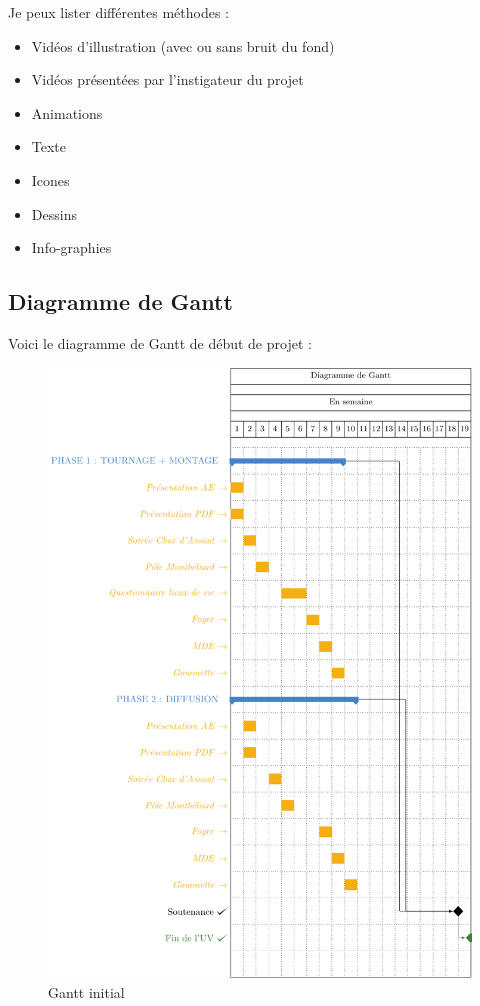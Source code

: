 Je peux lister différentes méthodes :
\begin{itemize}
    \item Vidéos d'illustration (avec ou sans bruit du fond)
    \item Vidéos présentées par l'instigateur du projet
    \item Animations
    \item Texte
    \item Icones
    \item Dessins
    \item Info-graphies
\end{itemize}

\subsection{Diagramme de Gantt}\label{subsec:diagramme-de-gantt}

Voici le diagramme de Gantt de début de projet :

\begin{figure}[!h]
    \begin{center}
        \includegraphics[scale=0.6]{ressources/gantt}
        \caption{Gantt initial \label{fig:ganttIni}}
    \end{center}
\end{figure}



